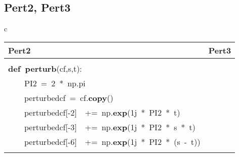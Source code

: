 \documentclass{article}\usepackage[]{graphicx}\usepackage[dvipsnames,table]{xcolor}
\makeatletter
\newcommand{\hlnum}[1]{\textcolor[rgb]{0.686,0.059,0.569}{#1}}%
\newcommand{\hlopt}[1]{\textcolor[rgb]{0,0,0}{#1}}%
\newcommand{\hldef}[1]{\textcolor[rgb]{0.345,0.345,0.345}{#1}}%
\newcommand{\hlkwa}[1]{\textcolor[rgb]{0.161,0.373,0.58}{\textbf{#1}}}%
\newcommand{\hlkwb}[1]{\textcolor[rgb]{0.69,0.353,0.396}{#1}}%
\newcommand{\hlkwd}[1]{\textcolor[rgb]{0.737,0.353,0.396}{\textbf{#1}}}%
\newenvironment{kframe}{%
 \def\at@end@of@kframe{}%
 \ifinner\ifhmode%
  \def\at@end@of@kframe{\end{minipage}}%
  \begin{minipage}{\columnwidth}%
 \fi\fi%
 \def\FrameCommand##1{\hskip\@totalleftmargin \hskip-\fboxsep
 \colorbox{shadecolor}{##1}\hskip-\fboxsep
     \hskip-\linewidth \hskip-\@totalleftmargin \hskip\columnwidth}%
 \MakeFramed {\advance\hsize-\width
   \@totalleftmargin\z@ \linewidth\hsize
   \@setminipage}}%
 {\par\unskip\endMakeFramed%
 \at@end@of@kframe}
\newenvironment{knitrout}{}{} %
\makeatother
\begin{document}
\subsection{Pert2, Pert3}
\begin{center}
\begin{tabular}{c}
\begin{tabular}{m{10cm}m{10cm}}
\toprule
Pert2 & Pert3 \\
\midrule
\begin{minipage}[m]{10cm}
\begin{knitrout}\tiny
\definecolor{shadecolor}{rgb}{0.969, 0.969, 0.969}\color{fgcolor}\begin{kframe}
\noindent
\ttfamily
\hldef{}\hlkwb{@njit}\hspace*{\fill}\\
\hldef{}\hlkwa{def\ }\hldef{}\hlkwd{perturb\textunderscore 2}\hldef{}\hlopt{(}\hldef{cf}\hlopt{,}\hldef{s}\hlopt{,}\hldef{t}\hlopt{):}\hspace*{\fill}\\
\hldef{}\hldef{\ \ \ \ }\hldef{PI2\ }\hlopt{=\ }\hldef{}\hlnum{2\ }\hldef{}\hlopt{{*}\ }\hldef{np}\hlopt{.}\hldef{pi}\hspace*{\fill}\\
\hldef{}\hldef{\ \ \ \ }\hldef{perturbed\textunderscore cf\ }\hlopt{=\ }\hldef{cf}\hlopt{.}\hldef{}\hlkwd{copy}\hldef{}\hlopt{()}\hspace*{\fill}\\
\hldef{}\hldef{\ \ \ \ }\hldef{perturbed\textunderscore cf}\hlopt{{[}{-}}\hldef{}\hlnum{2}\hldef{}\hlopt{{]}}\hldef{\ \ }\hlopt{+=\ }\hldef{np}\hlopt{.}\hldef{}\hlkwd{exp}\hldef{}\hlopt{(}\hldef{}\hlnum{1}\hldef{j\ }\hlopt{{*}\ }\hldef{PI2\ }\hlopt{{*}\ }\hldef{t}\hlopt{)}\hspace*{\fill}\\
\hldef{}\hldef{\ \ \ \ }\hldef{perturbed\textunderscore cf}\hlopt{{[}{-}}\hldef{}\hlnum{3}\hldef{}\hlopt{{]}}\hldef{\ \ }\hlopt{+=\ }\hldef{np}\hlopt{.}\hldef{}\hlkwd{exp}\hldef{}\hlopt{(}\hldef{}\hlnum{1}\hldef{j\ }\hlopt{{*}\ }\hldef{PI2\ }\hlopt{{*}\ }\hldef{s\ }\hlopt{{*}\ }\hldef{t}\hlopt{)}\hspace*{\fill}\\
\hldef{}\hldef{\ \ \ \ }\hldef{perturbed\textunderscore cf}\hlopt{{[}{-}}\hldef{}\hlnum{6}\hldef{}\hlopt{{]}}\hldef{\ \ }\hlopt{+=\ }\hldef{np}\hlopt{.}\hldef{}\hlkwd{exp}\hldef{}\hlopt{(}\hldef{}\hlnum{1}\hldef{j\ }\hlopt{{*}\ }\hldef{PI2\ }\hlopt{{*}\ (}\hldef{s\ }\hlopt{{-}\ }\hldef{t}\hlopt{))}\hspace*{\fill}\\

\end{kframe}
\end{knitrout}
\end{minipage}
\end{tabular}
\end{tabular}
\end{center}
\end{document}
